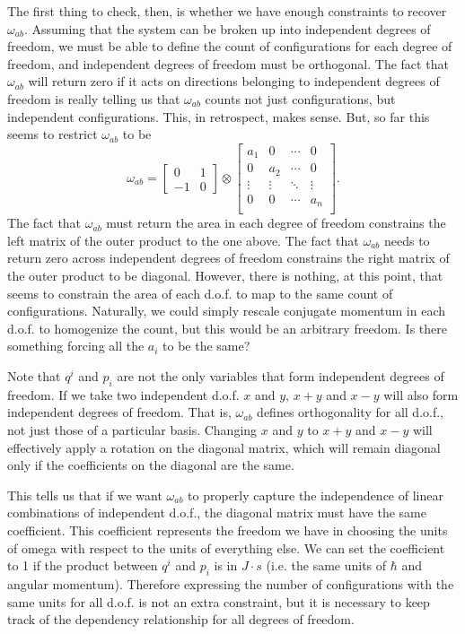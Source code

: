 The first thing to check, then, is whether we have enough constraints to recover $\omega_{ab}$. Assuming that the system can be broken up into independent degrees of freedom, we must be able to define the count of configurations for each degree of freedom, and independent degrees of freedom must be orthogonal. The fact that $\omega_{ab}$ will return zero if it acts on directions belonging to independent degrees of freedom is really telling us that $\omega_{ab}$ counts not just configurations, but independent configurations. This, in retrospect, makes sense. But, so far this seems to restrict $\omega_{ab}$ to be
\begin{equation}
	\omega_{ab} = \left[\begin{array}{cc}
		0 & 1 \\
		-1 & 0 
	\end{array} \right] \otimes   \left[ {\begin{array}{cccc}
		a_{1} & 0 & \cdots & 0\\
		0 & a_{2} & \cdots & 0\\
		\vdots & \vdots & \ddots & \vdots\\
		0 & 0 & \cdots & a_{n}\\
\end{array} } \right].
\end{equation}
The fact that $\omega_{ab}$ must return the area in each degree of freedom constrains the left matrix of the outer product to the one above. The fact that $\omega_{ab}$ needs to return zero across independent degrees of freedom constrains the right matrix of the outer product to be diagonal. However, there is nothing, at this point, that seems to constrain the area of each d.o.f. to map to the same count of configurations. Naturally, we could simply rescale conjugate momentum in each d.o.f. to homogenize the count, but this would be an arbitrary freedom. Is there something forcing all the $a_i$ to be the same?

Note that $q^i$ and $p_i$ are not the only variables that form independent degrees of freedom. If we take two independent d.o.f. $x$ and $y$, $x+y$ and $x-y$ will also form independent degrees of freedom. That is, $\omega_{ab}$ defines orthogonality for all d.o.f., not just those of a particular basis. Changing $x$ and $y$ to $x+y$ and $x-y$ will effectively apply a rotation on the diagonal matrix, which will remain diagonal only if the coefficients on the diagonal are the same.

This tells us that if we want $\omega_{ab}$ to properly capture the independence of linear combinations of independent d.o.f., the diagonal matrix must have the same coefficient. This coefficient represents the freedom we have in choosing the units of omega with respect to the units of everything else. We can set the coefficient to 1 if the product between $q^i$ and $p_i$ is in $J\cdot s$ (i.e. the same units of $\hbar$ and angular momentum). Therefore expressing the number of configurations with the same units for all d.o.f. is not an extra constraint, but it is necessary to keep track of the dependency relationship for all degrees of freedom.

